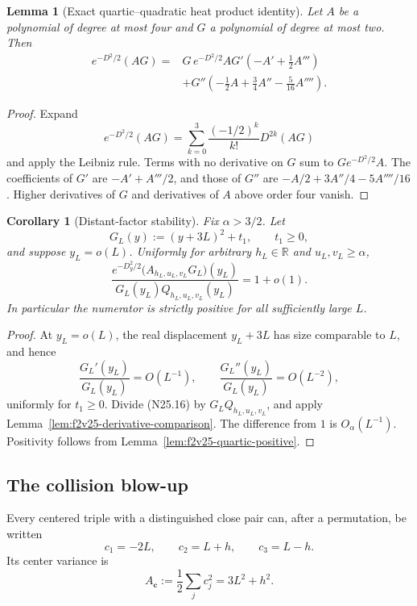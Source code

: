 \documentclass[11pt]{article}
\newtheorem{lemma}[theorem]{Lemma}
\newtheorem{corollary}[theorem]{Corollary}
\theoremstyle{definition}
\theoremstyle{remark}
\begin{document}
\begin{lemma}[Exact quartic--quadratic heat product identity]
\label{lem:f2v25-product}
Let \(A\) be a polynomial of degree at most four and \(G\) a polynomial
of degree at most two.  Then
\[
\begin{aligned}
 e^{-D^2/2}(AG)
={}&G\,e^{-D^2/2}A
G'\left(-A'+\frac12A'''\right)\\
&+G''\left(-\frac12A+\frac34A''
                 -\frac5{16}A''''\right).
\end{aligned}
\tag{N25.16}
\]
\end{lemma}

\begin{proof}
Expand
\[
 e^{-D^2/2}(AG)
 =\sum_{k=0}^3\frac{(-1/2)^k}{k!}D^{2k}(AG)
 \tag{N25.17}
\]
and apply the Leibniz rule.  Terms with no derivative on \(G\) sum to
\(G e^{-D^2/2}A\).  The coefficients of \(G'\) are
\(-A'+A'''/2\), and those of \(G''\) are
\(-A/2+3A''/4-5A''''/16\).  Higher derivatives of \(G\) and derivatives
of \(A\) above order four vanish.
\end{proof}

\begin{corollary}[Distant-factor stability]
\label{cor:f2v25-distant}
Fix \(\alpha>3/2\).  Let
\[
 G_L(y):=(y+3L)^2+t_1,\qquad t_1\geq0,
 \tag{N25.18}
\]
and suppose \(y_L=o(L)\).  Uniformly for arbitrary
\(h_L\in\mathbb R\) and \(u_L,v_L\geq\alpha\),
\[
 \frac{e^{-D_y^2/2}
 \bigl(A_{h_L,u_L,v_L}G_L\bigr)(y_L)}
 {G_L(y_L)Q_{h_L,u_L,v_L}(y_L)}
 =1+o(1).
 \tag{N25.19}
\]
In particular the numerator is strictly positive for all sufficiently
large \(L\).
\end{corollary}

\begin{proof}
At \(y_L=o(L)\), the real displacement \(y_L+3L\) has size comparable
to \(L\), and hence
\[
 \frac{G_L'(y_L)}{G_L(y_L)}=O(L^{-1}),
 \qquad
 \frac{G_L''(y_L)}{G_L(y_L)}=O(L^{-2}),
 \tag{N25.20}
\]
uniformly for \(t_1\geq0\).  Divide \textup{(N25.16)} by
\(G_LQ_{h_L,u_L,v_L}\), and apply
Lemma~\ref{lem:f2v25-derivative-comparison}.  The difference from \(1\)
is \(O_\alpha(L^{-1})\).  Positivity follows from
Lemma~\ref{lem:f2v25-quartic-positive}.
\end{proof}

\subsection{The collision blow-up}
\label{subsec:f2v25-collision}

Every centered triple with a distinguished close pair can, after a
permutation, be written
\[
 c_1=-2L,\qquad c_2=L+h,\qquad c_3=L-h.
 \tag{N25.21}
\]
Its center variance is
\[
 A_{\bm c}:=\frac12\sum_jc_j^2=3L^2+h^2.
 \tag{N25.22}
\]
\end{document}
